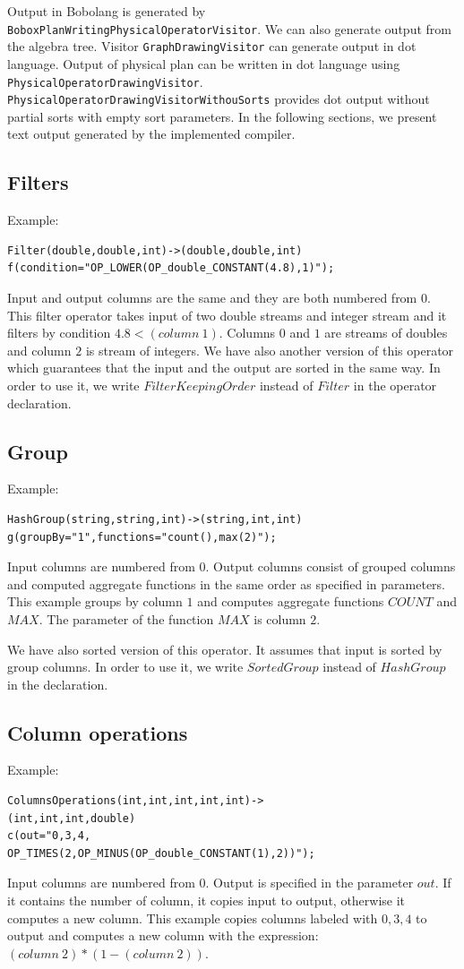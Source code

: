 Output in Bobolang is generated by \texttt{Bobox\-Plan\-Writing\-Physical\-Operator\-Vi\-si\-tor}. We can also generate output from the algebra tree. Visitor \texttt{Graph\-Drawing\-Visitor} can generate output in dot language. Output of physical plan can be written in dot language using \texttt{Physical\-Operator\-Drawing\-Visitor}. \texttt{Physical\-Operator\-Drawing\-Visitor\-WithouSorts} provides dot output without partial sorts with empty sort parameters. In the following sections, we present text output generated by the implemented compiler.

\subsection{Filters}
Example: 
\begin{lstlisting}
Filter(double,double,int)->(double,double,int)
f(condition="OP_LOWER(OP_double_CONSTANT(4.8),1)"); 
\end{lstlisting}

Input and output columns are the same and they are both numbered from $0$.
This filter operator takes input of two double streams and integer stream and it filters by condition $4.8<(column~1)$. Columns $0$ and $1$ are streams of doubles and column $2$ is stream of integers. We have also another version of this operator which guarantees that the input and the output are sorted in the same way. In order to use it, we write $FilterKeepingOrder$ instead of $Filter$ in the operator declaration. 

\subsection{Group}
Example: 
\begin{lstlisting}
HashGroup(string,string,int)->(string,int,int)
g(groupBy="1",functions="count(),max(2)");
\end{lstlisting}
Input columns are numbered from $0$. Output columns consist of grouped columns and computed aggregate functions in the same order as specified in parameters. 
This example groups by column $1$ and computes aggregate functions $COUNT$ and $MAX$. The parameter of the function $MAX$ is column $2$. 

We have also sorted version of this operator. It assumes that input is sorted by group columns. In order to use it, we write $SortedGroup$ instead of $HashGroup$ in the declaration.

\subsection{Column operations}
Example: 
\begin{lstlisting} 
ColumnsOperations(int,int,int,int,int)->
(int,int,int,double)
c(out="0,3,4,
OP_TIMES(2,OP_MINUS(OP_double_CONSTANT(1),2))"); 
\end{lstlisting}
Input columns are numbered from $0$. Output is specified in the parameter $out$. If it contains the number of column, it copies input to output, otherwise it computes a new column. 
This example copies columns labeled with $0,3,4$ to output and computes a new column with the expression: $(column~2)*(1-(column~2))$.

